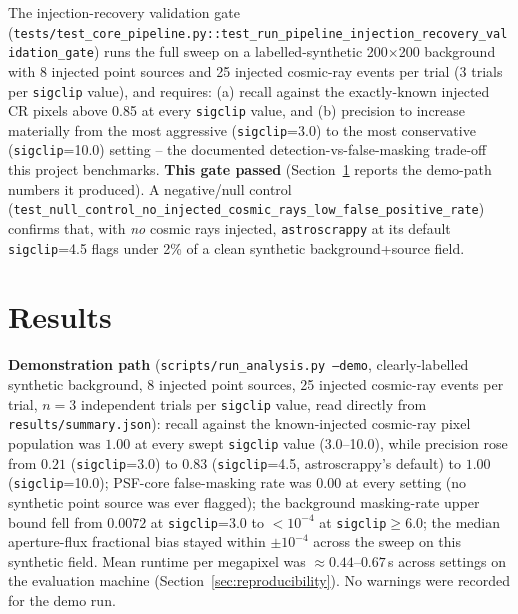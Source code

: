 \documentclass[11pt]{article}
\begin{document}
The injection-recovery validation gate
(\texttt{tests/test\_core\_pipeline.py::test\_run\_pipeline\_injection\_recovery\_validation\_gate})
runs the full sweep on a labelled-synthetic 200$\times$200 background with 8
injected point sources and 25 injected cosmic-ray events per trial ($3$
trials per \texttt{sigclip} value), and requires: (a) recall against the
exactly-known injected CR pixels above 0.85 at every \texttt{sigclip} value,
and (b) precision to increase materially from the most aggressive
(\texttt{sigclip}=3.0) to the most conservative (\texttt{sigclip}=10.0)
setting -- the documented detection-vs-false-masking trade-off this project
benchmarks. \textbf{This gate passed} (Section~\ref{sec:results} reports the
demo-path numbers it produced). A negative/null control
(\texttt{test\_null\_control\_no\_injected\_cosmic\_rays\_low\_false\_positive\_rate})
confirms that, with \emph{no} cosmic rays injected, \texttt{astroscrappy} at
its default \texttt{sigclip}=4.5 flags under 2\% of a clean synthetic
background+source field.

\section{Results}
\label{sec:results}
\textbf{Demonstration path} (\texttt{scripts/run\_analysis.py --demo},
clearly-labelled synthetic background, 8 injected point sources, 25 injected
cosmic-ray events per trial, $n=3$ independent trials per \texttt{sigclip}
value, read directly from \texttt{results/summary.json}): recall against the
known-injected cosmic-ray pixel population was $1.00$ at every swept
\texttt{sigclip} value (3.0--10.0), while precision rose from $0.21$
(\texttt{sigclip}=3.0) to $0.83$ (\texttt{sigclip}=4.5, astroscrappy's
default) to $1.00$ (\texttt{sigclip}=10.0); PSF-core false-masking rate was
$0.00$ at every setting (no synthetic point source was ever flagged); the
background masking-rate upper bound fell from $0.0072$ at
\texttt{sigclip}=3.0 to $<10^{-4}$ at \texttt{sigclip}$\ge 6.0$; the median
aperture-flux fractional bias stayed within $\pm 10^{-4}$ across the sweep on
this synthetic field. Mean runtime per megapixel was
$\approx 0.44$--$0.67$\,s across settings on the evaluation machine
(Section~\ref{sec:reproducibility}). No warnings were recorded for the demo
run.
\end{document}
